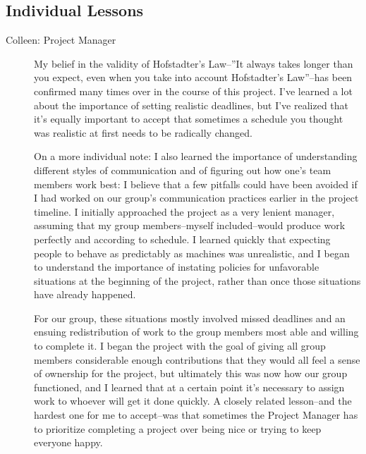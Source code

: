 \subsection{Individual Lessons}
\begin{description}
\item[Colleen: Project Manager] My belief in the validity of
  Hofstadter’s Law--”It always takes longer than you expect, even when
  you take into account Hofstadter's Law”--has been confirmed many
  times over in the course of this project. I’ve learned a lot about
  the importance of setting realistic deadlines, but I’ve realized
  that it’s equally important to accept that sometimes a schedule you
  thought was realistic at first needs to be radically changed.

  On a more individual note: I also learned the importance of understanding
  different styles of communication and of figuring out how one’s team
  members work best: I believe that a few pitfalls could have
  been avoided if I had worked on our group's communication practices
  earlier in the project timeline. I initially approached the project as
  a very lenient manager, assuming that my group members--myself
  included--would produce work perfectly and according to schedule. I
  learned quickly that expecting people to behave as predictably as
  machines was unrealistic, and I began to understand the importance
  of instating policies for unfavorable situations at the
  beginning of the project, rather than once those situations have
  already happened.

  For our group, these situations mostly involved missed deadlines and an
  ensuing redistribution of work to the group members most able and willing
  to complete it. I began the project with the goal of giving all
  group members considerable enough contributions that they would
  all feel a sense of ownership for the project, but ultimately this
  was now how our group functioned, and I learned that at a certain
  point it's necessary to assign work to whoever will get it done
  quickly. A closely related lesson--and the hardest one for me to
  accept--was that sometimes the Project Manager has to prioritize
  completing a project over being nice or trying to keep everyone happy.


\end{description}
